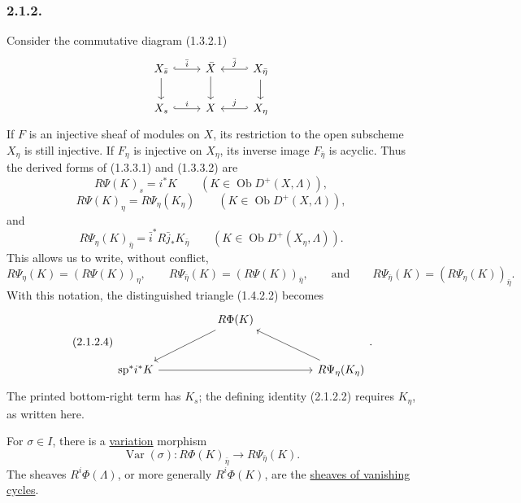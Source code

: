 \subsubsection*{2.1.2.}
Consider the commutative diagram (1.3.2.1)
\begin{equation}\notag
\begin{tikzcd}
X_{\bar s} \arrow[r, hook, "\bar i"] \arrow[d]
  & \bar X \arrow[d]
  & X_{\bar\eta} \arrow[l, hook', "\bar j"'] \arrow[d] \\
X_s \arrow[r, hook, "i"] & X & X_\eta \arrow[l, hook', "j"']
\end{tikzcd}
\end{equation}
If $F$ is an injective sheaf of modules on $X$, its restriction to the
open subscheme $X_\eta$ is still injective.  If $F_\eta$ is injective
on $X_\eta$, its inverse image $F_{\bar\eta}$ is acyclic.  Thus the
derived forms of (1.3.3.1) and (1.3.3.2) are
\begin{equation}\tag{2.1.2.1}
R\Psi(K)_s=i^*K
\qquad(K\in\operatorname{Ob}D^+(X,\Lambda)),
\end{equation}
\begin{equation}\tag{2.1.2.2}
R\Psi(K)_\eta=R\Psi_\eta(K_\eta)
\qquad(K\in\operatorname{Ob}D^+(X,\Lambda)),
\end{equation}
and
\begin{equation}\tag{2.1.2.3}
R\Psi_\eta(K)_{\bar\eta}
=\bar i^*R\bar j_*K_{\bar\eta}
\qquad(K\in\operatorname{Ob}D^+(X_\eta,\Lambda)).
\end{equation}
This allows us to write, without conflict,
\begin{equation*}
R\Psi_\eta(K)=(R\Psi(K))_\eta,
\qquad
R\Psi_{\bar\eta}(K)=(R\Psi(K))_{\bar\eta},
\qquad\text{and}\qquad
R\Psi_{\bar\eta}(K)=(R\Psi_\eta(K))_{\bar\eta}.
\end{equation*}
With this notation, the distinguished triangle (1.4.2.2) becomes
\begin{equation}\tag{2.1.2.4}
\begin{tikzcd}[row sep=large, column sep=huge]
{} & R\Phi(K) \arrow[dl] & {} \\
\mathrm{sp}^*i^*K \arrow[rr] & {}
  & R\Psi_\eta(K_\eta) \arrow[ul]
\end{tikzcd}
.\end{equation}
The printed bottom-right term has $K_s$; the defining identity
(2.1.2.2) requires $K_\eta$, as written here.

For $\sigma\in I$, there is a \underline{variation} morphism
\begin{equation}\tag{2.1.2.5}
\operatorname{Var}(\sigma):R\Phi(K)_{\bar\eta}
\longrightarrow R\Psi_{\bar\eta}(K).
\end{equation}
The sheaves $R^i\Phi(\Lambda)$, or more generally $R^i\Phi(K)$, are
the \underline{sheaves of vanishing cycles}.

